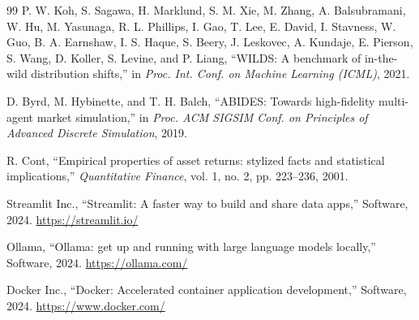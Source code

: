 \documentclass[10pt,twocolumn,letterpaper]{article}
\begin{document}
\begin{thebibliography}{99}
P. W. Koh, S. Sagawa, H. Marklund, S. M. Xie, M. Zhang, A. Balsubramani,
W. Hu, M. Yasunaga, R. L. Phillips, I. Gao, T. Lee, E. David, I. Stavness,
W. Guo, B. A. Earnshaw, I. S. Haque, S. Beery, J. Leskovec, A. Kundaje,
E. Pierson, S. Wang, D. Koller, S. Levine, and P. Liang, ``WILDS: A
benchmark of in-the-wild distribution shifts,'' in \emph{Proc. Int.
Conf. on Machine Learning (ICML)}, 2021.

D. Byrd, M. Hybinette, and T. H. Balch, ``ABIDES: Towards
high-fidelity multi-agent market simulation,'' in \emph{Proc. ACM
SIGSIM Conf. on Principles of Advanced Discrete Simulation}, 2019.

R. Cont, ``Empirical properties of asset returns: stylized facts and
statistical implications,'' \emph{Quantitative Finance}, vol. 1,
no. 2, pp. 223--236, 2001.



Streamlit Inc., ``Streamlit: A faster way to build and share data apps,''
Software, 2024. \url{https://streamlit.io/}

Ollama, ``Ollama: get up and running with large language models locally,''
Software, 2024. \url{https://ollama.com/}

Docker Inc., ``Docker: Accelerated container application development,''
Software, 2024. \url{https://www.docker.com/}

\end{thebibliography}
\end{document}

